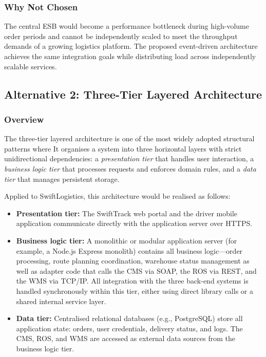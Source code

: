\subsubsection{Why Not Chosen}

The central ESB would become a performance bottleneck during high-volume order periods and cannot be independently scaled to meet the throughput demands of a growing logistics platform. The proposed event-driven architecture achieves the same integration goals while distributing load across independently scalable services.

\subsection{Alternative 2: Three-Tier Layered Architecture}
\label{subsec:alt2}

\subsubsection{Overview}

The three-tier layered architecture is one of the most widely adopted structural patterns where It organises a system into three horizontal layers with strict unidirectional dependencies: a \textit{presentation tier} that handles user interaction, a \textit{business logic tier} that processes requests and enforces domain rules, and a \textit{data tier} that manages persistent storage.

Applied to SwiftLogistics, this architecture would be realised as follows:

\begin{itemize}
    \item \textbf{Presentation tier:} The SwiftTrack web portal and the driver mobile application communicate directly with the application server over HTTPS.
    \item \textbf{Business logic tier:} A monolithic or modular application server (for example, a Node.js Express monolith) contains all business logic—order processing, route planning coordination, warehouse status management as well as adapter code that calls the CMS via SOAP, the ROS via REST, and the WMS via TCP/IP. All integration with the three back-end systems is handled synchronously within this tier, either using direct library calls or a shared internal service layer.
    \item \textbf{Data tier:} Centralised relational databases (e.g., PostgreSQL) store all application state: orders, user credentials, delivery status, and logs. The CMS, ROS, and WMS are accessed as external data sources from the business logic tier.
\end{itemize}

